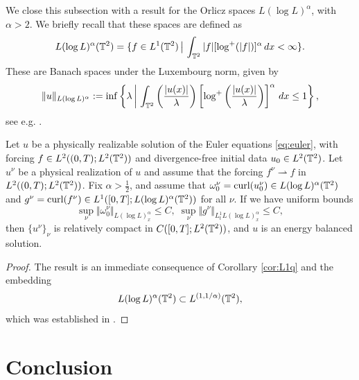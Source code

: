 \documentclass[reqno,12pt]{amsart}
\DeclareMathOperator{\curl}{curl}
\begin{document}
We close this subsection with a result for the Orlicz spaces $L(\log L)^\alpha$, with $\alpha > 2$. We briefly recall that these spaces are defined as
\[L(\log L)^\alpha (\mathbb{T}^2) = \{ f \in L^1(\mathbb{T}^2) \, \big| \, \int_{\mathbb{T}^2} |f| [\log^+(|f|)]^\alpha \, dx < \infty\}.
\]
These are Banach spaces under the Luxembourg norm, given by
\[\|u\|_{L(\log L)^\alpha}:=\inf \left\{\lambda \, \bigg| \, \int_{\mathbb{T}^2} \left(\frac{|u(x)|}{\lambda}\right) \left[\log^+ \left(\frac{|u(x)|}{\lambda}\right)\right]^\alpha \,dx\leq 1\right\},\]
 see e.g. \cite{BennettSharpley}.

\begin{corollary} \label{cor:LlogLalpha}
   Let $u$ be a physically realizable solution of the Euler equations \eqref{eq:euler}, with forcing $f\in L^2((0,T);L^2(\mathbb{T}^2))$ and divergence-free initial data $u_0 \in L^2(\mathbb{T}^2)$. Let $u^\nu$ be a physical realization of $u$ and assume that the forcing $f^\nu \rightharpoonup f$ in $L^2((0,T);L^2(\mathbb{T}^2))$. Fix $\alpha > \displaystyle{\frac{1}{2}}$, and assume that $\omega_0^\nu = \curl(u^\nu_0)\in L(\log L)^\alpha(\T^2)$ and $g^\nu = \curl(f^\nu) \in L^1([0,T];L(\log L)^\alpha(\T^2))$ for all $\nu$. If we have uniform bounds
  \[
  \sup_{\nu} \Vert \omega_0^\nu \Vert_{L(\log L)^\alpha_x}\le C, \;  \sup_{\nu} \Vert g^\nu \Vert_{L^1_tL(\log L)^\alpha_x} \le C,
  \]
  then $\{u^\nu\}_{\nu}$ is relatively compact in $C([0,T];L^2(\mathbb{T}^2))$, and $u$ is an energy balanced solution.
\end{corollary}

\begin{proof}
The result is an immediate consequence of Corollary \ref{cor:L1q} and the embedding
\[L(\log L)^\alpha (\mathbb{T}^2) \subset L^{(1,1/\alpha)}(\mathbb{T}^2),\]
which was established in \cite[Lemma 2.1]{LNT}.
\end{proof}


\section{Conclusion}
\end{document}
